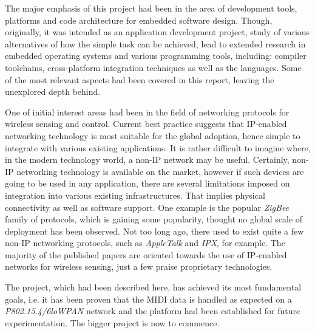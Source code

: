   The major emphasis of this project had been in the area of development
 tools, platforms and code architecture for embedded software design.
 Though, originally, it was intended as an application development project,
 study of various alternatives of how the simple task can be achieved, lead
 to extended research in embedded operating systems and various programming
 tools, including: compiler toolchains, cross-platform integration techniques
 as well as the languages. Some of the most relevant aspects had been covered 
 in this report, leaving the unexplored depth behind.

  One of initial interest areas had been in the field of networking protocols
 for wireless sensing and control. Current best practice suggests that IP-enabled
 networking technology is most suitable for the global adoption, hence simple
 to integrate with various existing applications. It is rather difficult to
 imagine where, in the modern technology world, a non-IP network may be useful.
 Certainly, non-IP networking technology is available on the market, however if
 such devices are going to be used in any application, there are several limitations
 imposed on integration into various existing infrastructures. That implies
 physical connectivity as well as software support. One example is the popular
 \emph{ZigBee} family of protocols, which is gaining some popularity, thought
 no global scale of deployment has been observed. Not too long ago, there used
 to exist quite a few non-IP networking protocols, such as \emph{AppleTalk}
 and \emph{IPX}, for example. The majority of the published papers are oriented
 towards the use of IP-enabled networks for wireless sensing, just a few praise
 proprietary technologies.

  The project, which had been described here, has achieved its most
 fundamental goals, i.e. it has been proven that the MIDI data is
 handled as expected on a \emph{P802.15.4/6loWPAN} network and the
 platform had been established for future experimentation.
 The bigger project is now to commence.








